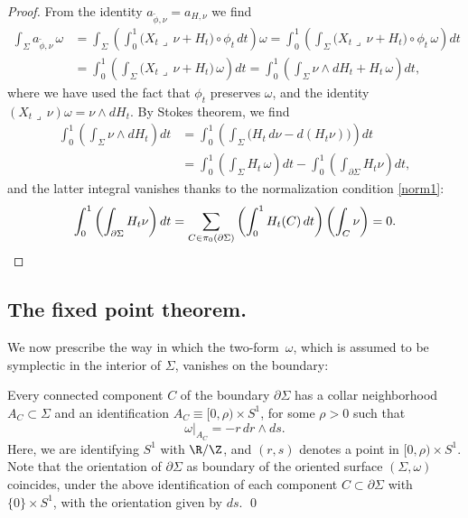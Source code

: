 \begin{proof}
From the identity $a_{\tilde{\phi},\nu}=a_{H,\nu}$ we find
\begin{align*}
\int_{\Sigma} a_{\tilde{\phi},\nu} \, \omega
&= \int_{\Sigma} \left( \int_0^1 \bigl( X_t \lrcorner \, \nu + H_t \bigr) \circ \phi_t\, dt \right) \omega = \int_0^1 \left( \int_{\Sigma} \bigl( X_t \lrcorner \, \nu + H_t \bigr) \circ \phi_t\, \omega \right) dt \\
&= \int_0^1 \left( \int_{\Sigma} \bigl( X_t \lrcorner \, \nu + H_t \bigr) \, \omega \right) dt
= \int_0^1 \left( \int_{\Sigma} \nu \wedge dH_t + H_t\, \omega \right) dt,
\end{align*}
where we have used the fact that $\phi_t$ preserves $\omega$, and the identity $(X_t \lrcorner \, \nu)\omega = \nu \wedge dH_t$. By Stokes theorem, we find
\begin{align*}
\int_0^1 \left( \int_{\Sigma} \nu \wedge dH_t \right) dt & = \int_0^1 \left( \int_{\Sigma} \bigl( H_t\, d\nu - d(H_t \nu) \bigr) \right) dt \\
& = \int_0^1\left( \int_{\Sigma} H_t\, \omega \right) dt - \int_0^1 \left( \int_{\partial\Sigma} H_t \nu \right) dt,
\end{align*}
and the latter integral vanishes thanks to the normalization condition \eqref{norm1}:
\[
\int_0^1 \left( \int_{\partial\Sigma} H_t \nu \right) dt = \sum_{C\in\pi_0(\partial\Sigma)} \left( \int_0^1 H_t(C) \, dt \right) \left( \int_C \nu \right) = 0.
\qedhere
\]
\end{proof}

\subsection{The fixed point theorem.}\label{ss:fixed_point_thm}
We now prescribe the way in which the two-form~$\omega$, which is assumed to be symplectic in the interior of $\Sigma$, vanishes on the boundary:

\begin{ass}
\label{assumption}
Every connected component $C$ of the boundary $\partial \Sigma$ has a collar neighborhood $A_C\subset \Sigma$ and an identification $A_C\equiv [0,\rho) \times S^1$, for some $\rho>0$ such that
\[
\omega|_{A_C} = -r\, dr\wedge ds.
\]
Here, we are identifying $S^1$ with $\R/\Z$, and $(r,s)$ denotes a point in $[0,\rho) \times S^1$. Note that the orientation of $\partial \Sigma$ as boundary of the oriented surface $(\Sigma,\omega)$ coincides, under the above identification of each component $C\subset \partial \Sigma$ with $\{0\} \times S^1$, with the orientation given by $ds$.
\hfill\qed
\end{ass}

